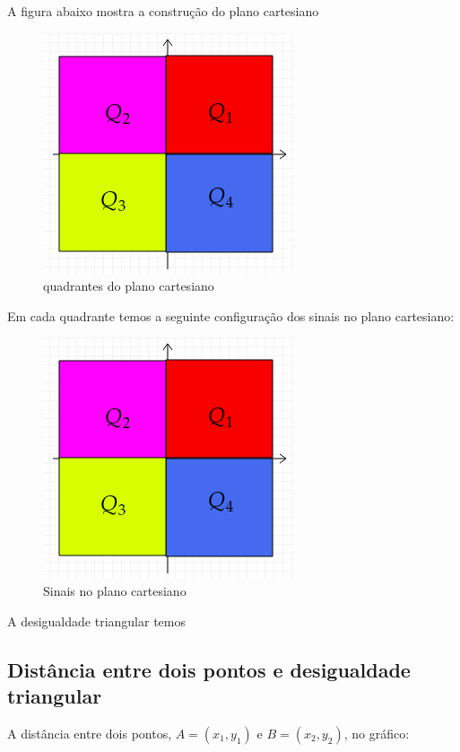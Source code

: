 \begin{multicols*}{2}
    A figura abaixo mostra a construção do plano cartesiano
    \begin{figure}[H]
        \centering
        \caption{quadrantes do plano cartesiano}
        \includegraphics[scale=0.5]{assets/rafael/img28.png}
    \end{figure}
    Em cada quadrante temos a seguinte configuração dos sinais no plano cartesiano:
    \begin{figure}[H]
        \caption{Sinais no plano cartesiano}
        \centering
        \includegraphics[scale=0.5]{assets/rafael/img28.png}
    \end{figure}

    A desigualdade triangular temos
    \subsection*{Distância entre dois pontos e desigualdade triangular}


    A distância entre dois pontos, $A = (x_1,y_1)$ e $B = (x_2,y_2)$, no gráfico:




\end{multicols*}
